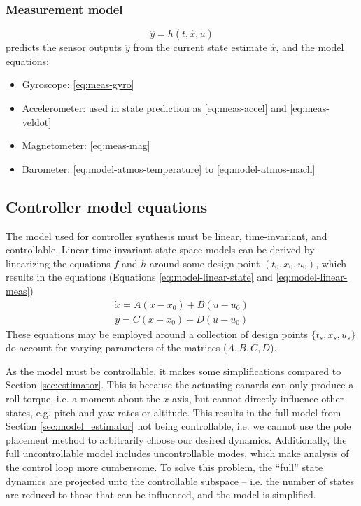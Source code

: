 \subsubsection{Measurement model} 
\begin{equation}
    \hat y = h(t, \hat x, u) \nonumber
\end{equation}
predicts the sensor outputs $\hat y$ from the current state estimate $\hat x$, and the model equations:
\begin{itemize}
    \item Gyroscope: \ref{eq:meas-gyro}
    \item Accelerometer: used in state prediction as \ref{eq:meas-accel} and \ref{eq:meas-veldot}
    \item Magnetometer: \ref{eq:meas-mag}
    \item Barometer: \ref{eq:model-atmos-temperature} to \ref{eq:model-atmos-mach}
\end{itemize}

\subsection{Controller model equations}
\label{sec:model_controller}
The model used for controller synthesis must be linear, time-invariant, and controllable.
Linear time-invariant state-space models can be derived by linearizing the equations $f$ and $h$ around some design point $(t_0, x_0, u_0)$, which results in the equations (Equations \ref{eq:model-linear-state} and \ref{eq:model-linear-meas})
\begin{align}
    \dot x = A (x-x_0) + B (u-u_0) \nonumber \\
    y = C (x-x_0) + D (u-u_0) \nonumber
\end{align}
These equations may be employed around a collection of design points $\{ t_s, x_s, u_s \}$ do account for varying parameters of the matrices ($A,B,C,D$).

As the model must be controllable, it makes some simplifications compared to Section \ref{sec:estimator}.
This is because the actuating canards can only produce a roll torque, i.e. a moment about the $x$-axis, but cannot directly influence other states, e.g. pitch and yaw rates or altitude.
This results in the full model from Section \ref{sec:model_estimator} not being controllable, i.e. we cannot use the pole placement method to arbitrarily choose our desired dynamics.
Additionally, the full uncontrollable model includes uncontrollable modes, which make analysis of the control loop more cumbersome. 
To solve this problem, the ``full'' state dynamics are projected unto the controllable subspace -- i.e. the number of states are reduced to those that can be influenced, and the model is simplified.  


